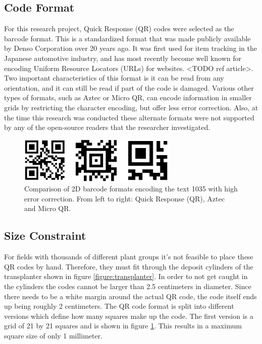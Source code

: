 \subsection{Code Format}
\label{section:code_format}

For this research project, Quick Response (QR) codes were selected as the barcode format. This is a standardized format that was made publicly available by Denso Corporation over 20 years ago.  It was first used for item tracking in the Japanese automotive industry, and has most recently become well known for encoding Uniform Resource Locators (URLs) for websites. <TODO ref article>.  Two important characteristics of this format is it can be read from any orientation, and it can still be read if part of the code is damaged.  Various other types of formats, such as Aztec or Micro QR, can encode information in smaller grids by restricting the character encoding, but offer less error correction.  Also, at the time this research was conducted these alternate formats were not supported by any of the open-source readers that the researcher investigated. 

\begin{figure}[htb]
	\centering
    \includegraphics[width=3in]{figures/generated_codes_1035.png}
    \caption[2D barcode formats]{Comparison of 2D barcode formats encoding the text 1035 with high error correction.  From left to right: Quick Response (QR), Aztec and Micro QR.}
    \label{barcode_formats}
\end{figure} 

\subsection{Size Constraint}

For fields with thousands of different plant groups it's not feasible to place these QR codes by hand.  Therefore, they must fit through the deposit cylinders of the transplanter shown in figure \ref{figure:transplanter}.  In order to not get caught in the cylinders the codes cannot be larger than 2.5 centimeters in diameter. Since there needs to be a white margin around the actual QR code, the code itself ends up being roughly 2 centimeters.  The QR code format is split into different versions which define how many squares make up the code.  The first version is a grid of 21 by 21 squares and is shown in figure \ref{barcode_formats}.  This results in a maximum square size of only 1 millimeter.  

